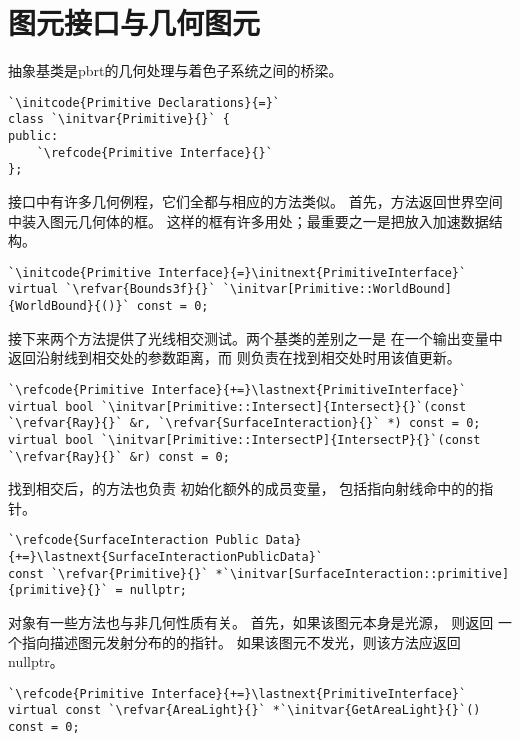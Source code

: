 \section{图元接口与几何图元}\label{sec:图元接口与几何图元}

抽象基类是pbrt的几何处理与着色子系统之间的桥梁。
\begin{lstlisting}
`\initcode{Primitive Declarations}{=}`
class `\initvar{Primitive}{}` {
public:
    `\refcode{Primitive Interface}{}`
};
\end{lstlisting}

接口中有许多几何例程，它们全都与相应的方法类似。
首先，方法返回世界空间中装入图元几何体的框。
这样的框有许多用处；最重要之一是把放入加速数据结构。
\begin{lstlisting}
`\initcode{Primitive Interface}{=}\initnext{PrimitiveInterface}`
virtual `\refvar{Bounds3f}{}` `\initvar[Primitive::WorldBound]{WorldBound}{()}` const = 0;
\end{lstlisting}

接下来两个方法提供了光线相交测试。两个基类的差别之一是\linebreak
{}在一个输出变量中
返回沿射线到相交处的参数距离，而
则负责在找到相交处时用该值更新。
\begin{lstlisting}
`\refcode{Primitive Interface}{+=}\lastnext{PrimitiveInterface}`
virtual bool `\initvar[Primitive::Intersect]{Intersect}{}`(const `\refvar{Ray}{}` &r, `\refvar{SurfaceInteraction}{}` *) const = 0;
virtual bool `\initvar[Primitive::IntersectP]{IntersectP}{}`(const `\refvar{Ray}{}` &r) const = 0;
\end{lstlisting}

找到相交后，的方法也负责
初始化额外的\linebreak{}成员变量，
包括指向射线命中的的指针。
\begin{lstlisting}
`\refcode{SurfaceInteraction Public Data}{+=}\lastnext{SurfaceInteractionPublicData}`
const `\refvar{Primitive}{}` *`\initvar[SurfaceInteraction::primitive]{primitive}{}` = nullptr;
\end{lstlisting}

对象有一些方法也与非几何性质有关。
首先，如果该图元本身是光源，
则返回
一个指向描述图元发射分布的的指针。
如果该图元不发光，则该方法应返回{\ttfamily nullptr}。
\begin{lstlisting}
`\refcode{Primitive Interface}{+=}\lastnext{PrimitiveInterface}`
virtual const `\refvar{AreaLight}{}` *`\initvar{GetAreaLight}{}`() const = 0;
\end{lstlisting}

